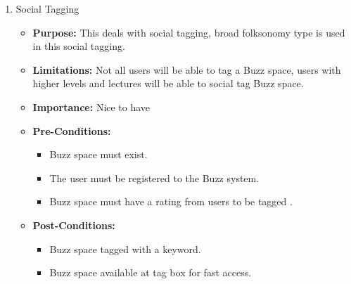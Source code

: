\documentclass[11pt]{article}
\begin{document}
\begin{enumerate}
				















\item Social Tagging 
\begin{itemize}
\item \textbf{Purpose:}
This deals with social tagging, broad folksonomy type is used in this social tagging.
\item\textbf{Limitations: } 
Not all users will be able to tag a Buzz space, users with higher levels and lectures will be able to social tag Buzz space.

\item \textbf{Importance:} Nice to have
\item \textbf{Pre-Conditions: }
	\begin{itemize}
		\item Buzz space must exist.
		\item The user must be registered to the Buzz system.
		\item Buzz space must have a rating from users to be tagged .
	\end{itemize}

\item \textbf{Post-Conditions: }
	\begin{itemize}
	\item Buzz space tagged with a keyword.
	\item Buzz space available at tag box for fast access.
	\end{itemize}
\end{itemize}


\end{enumerate}
\end{document}

